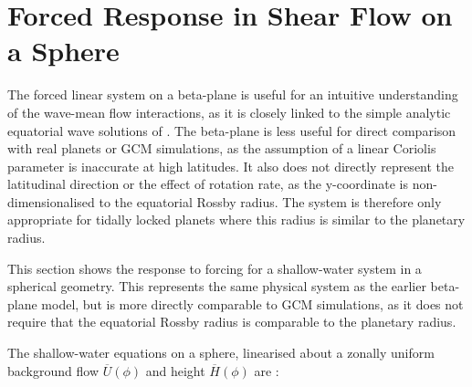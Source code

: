 


\section{Forced Response in Shear Flow on a Sphere}\label{sec:shear-flow-sphere}

The forced linear system on a beta-plane is useful for an intuitive understanding of the wave-mean flow interactions, as it is closely linked to the simple analytic equatorial wave solutions of \citet{matsuno1966quasi}. The beta-plane is less useful for direct comparison with real planets or GCM simulations, as the assumption of a linear Coriolis parameter is inaccurate at high latitudes. It also does not directly represent the latitudinal direction or the effect of rotation rate, as the y-coordinate is non-dimensionalised to the equatorial Rossby radius. The system is therefore only appropriate for tidally locked planets where this radius is similar to the planetary radius.

This section shows the response to forcing for a shallow-water system in a spherical geometry. This represents the same physical system as the earlier beta-plane model, but is more directly comparable to GCM simulations, as it does not require that the equatorial Rossby radius is comparable to the planetary radius.

The shallow-water equations on a sphere, linearised about a zonally uniform background flow $\overline{U}(\phi)$ and height $\overline{H}(\phi)$ are \citep{dunkerton1990laplace, iga2005spherical}:


